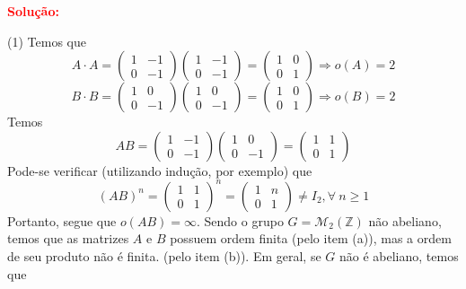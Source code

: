 \documentclass[12pt, a4paper]{article}
\newcommand{\negrito}[1]{\mbox{\boldmath{$#1$}}}
\begin{document}
\textbf{\textcolor{red}{Solução:}}
\begin{tasks}[counter-format={(tsk[a])},label-width=3.6ex, label-format = {\bfseries}, column-sep = {0pt}](1)
\task[\textcolor{Floresta}{$\negrito{(a)} $}] Temos que
\[
A \cdot A =  \left( \begin{array}{cc} 1 & -1 \\ 0 & -1 \end{array} \right)  \left( \begin{array}{cc} 1 & -1 \\ 0 & -1 \end{array} \right) =  \left( \begin{array}{cc} 1 & 0 \\ 0 & 1 \end{array} \right) \Rightarrow o(A) = 2
\]
\[
B \cdot B =  \left( \begin{array}{cc} 1 & 0 \\ 0 & -1 \end{array} \right)   \left( \begin{array}{cc} 1 & 0 \\ 0 & -1 \end{array} \right)=  \left( \begin{array}{cc} 1 & 0 \\ 0 & 1 \end{array} \right) \Rightarrow o(B) = 2
\]
\task[\textcolor{Floresta}{$\negrito{(b)} $}] Temos
\[
AB =  \left( \begin{array}{cc} 1 & -1 \\ 0 & -1 \end{array} \right) \left( \begin{array}{cc} 1 & 0 \\ 0 & -1 \end{array} \right) = \left( \begin{array}{cc} 1 & 1 \\ 0 & 1\end{array} \right)
\]
Pode-se verificar (utilizando indução, por exemplo) que
\[
(AB)^n = \left( \begin{array}{cc} 1 & 1 \\ 0 & 1\end{array} \right)^n = \left( \begin{array}{cc} 1 & n \\ 0 & 1\end{array} \right) \neq I_2, \forall \ n \ge 1
\]
Portanto, segue que $o(AB) = \infty.$
\task[\textcolor{Floresta}{$\negrito{(c)} $}] Sendo o grupo $G = \mathcal{M}_2(\mathbb{Z})$ não abeliano, temos que as matrizes $A$ e $B$ possuem ordem finita (pelo item (a)), mas a ordem de seu produto não é finita. (pelo item (b)). Em geral, se $G$ não é abeliano, temos que

\end{tasks}
\end{document}

